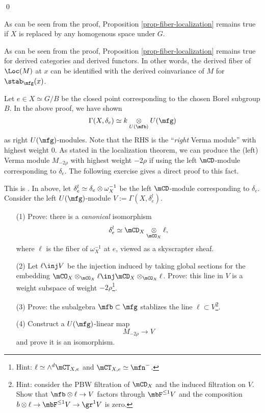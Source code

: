 	\qed

	\begin{rem}
		As can be seen from the proof, Proposition \ref{prop-fiber-localization} remains true if $X$ is replaced by any homogenous space under $G$.
	\end{rem}

	\begin{rem}
		As can be seen from the proof, Proposition \ref{prop-fiber-localization} remains true for derived categories and derived functors. In other words, the derived fiber of $\Loc(M)$ at $x$ can be identified with the derived coinvariance of $M$ for $\stab_\mfg(x)$.

	\end{rem}

	Let $e\in X \simeq G/B$ be the closed point corresponding to the chosen Borel subgroup $B$. In the above proof, we have shown
	\[
		 \Gamma(X, \delta_e ) \simeq k\ot_{U(\mfb)} U(\mfg)
	\]
	as right $U(\mfg)$-modules. Note that the RHS is the ``\emph{right} Verma module'' with highest weight $0$. As stated in the localization theorem, we can produce the (left) Verma module $M_{-2\rho}$ with highest weight $-2\rho$ if using the left $\mCD$-module corresponding to $\delta_e$. The following exercise gives a direct proof to this fact.

	\begin{exe}
		\label{exe-delta-Verma-2rho}
		This is . 
		In above, let $\delta_e^l\simeq \delta_e\ot \omega_{X}^{-1}$ be the left $\mCD$-module corresponding to $\delta_e$. Consider the left $U(\mfg)$-module $V:=\Gamma(X, \delta_e^l)$.
		
		\begin{itemize}
			\item[(1)]
				Prove: there is a \emph{canonical} isomorphism
				\[
					\delta_e^l \simeq \mCD_{X} \ot_{\mCO_{X}} \ell,
				\]
				where $\ell$ is the fiber of $\omega_{X}^{-1}$ at $e$, viewed as a skyscrapter sheaf.
			\item[(2)]
				Let $ \ell \inj V$ be the injection induced by taking global sections for the embedding $\mCO_{X} \ot_{\mCO_{X}} \ell \inj \mCD_{X} \ot_{\mCO_{X}}\ell$. Prove: this line in $V$ is a weight subspace of weight $-2\rho$\footnote{Hint: $\ell \simeq \wedge^d \mCT_{X,e} $ and $\mCT_{X,e}\simeq \mfn^-$.}.
			\item[(3)]
				Prove: the subalgebra $\mfb \subset \mfg$ stablizes the line $\ell\subset V$\footnote{Hint: consider the PBW filtration of $\mCD_X$ and the induced filtration on $V$. Show that $\mfb \ot \ell \to V$ factors through $\mbF^{\le 1} V$ and the composition $b\ot \ell \to \mbF^{\le 1} V \to \gr^1 V$ is zero.}.
			\item[(4)]
				Construct a $U(\mfg)$-linear map 
				\[
					M_{-2\rho} \to V
				\]
				and prove it is an isomorphism.
		\end{itemize}

	\end{exe}



